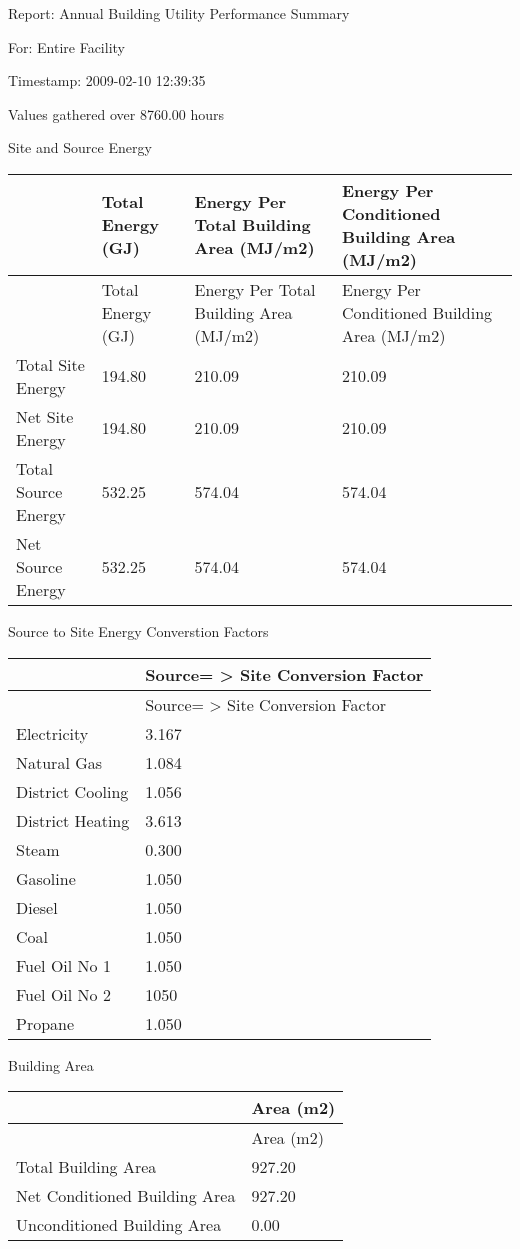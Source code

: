 Report: Annual Building Utility Performance Summary

For: Entire Facility

Timestamp: 2009-02-10 12:39:35

Values gathered over 8760.00 hours

Site and Source Energy

\begin{longtable}[c]{>{\raggedright}p{1.5in}>{\raggedright}p{1.5in}>{\raggedright}p{1.5in}>{\raggedright}p{1.5in}}
\toprule 
~ & Total Energy (GJ) & Energy Per Total Building Area (MJ/m2) & Energy Per Conditioned Building Area (MJ/m2) \tabularnewline
\midrule
\endfirsthead

\toprule 
~ & Total Energy (GJ) & Energy Per Total Building Area (MJ/m2) & Energy Per Conditioned Building Area (MJ/m2) \tabularnewline
\midrule
\endhead

Total Site Energy & 194.80 & 210.09 & 210.09 \tabularnewline
Net Site Energy & 194.80 & 210.09 & 210.09 \tabularnewline
Total Source Energy & 532.25 & 574.04 & 574.04 \tabularnewline
Net Source Energy & 532.25 & 574.04 & 574.04 \tabularnewline
\bottomrule
\end{longtable}

Source to Site Energy Converstion Factors

\begin{longtable}[c]{@{}ll@{}}
\toprule 
~ & Source= > Site Conversion Factor \tabularnewline
\midrule
\endfirsthead

\toprule 
~ & Source= > Site Conversion Factor \tabularnewline
\midrule
\endhead

Electricity & 3.167 \tabularnewline
Natural Gas & 1.084 \tabularnewline
District Cooling & 1.056 \tabularnewline
District Heating & 3.613 \tabularnewline
Steam & 0.300 \tabularnewline
Gasoline & 1.050 \tabularnewline
Diesel & 1.050 \tabularnewline
Coal & 1.050 \tabularnewline
Fuel Oil No 1 & 1.050 \tabularnewline
Fuel Oil No 2 & 1050 \tabularnewline
Propane & 1.050 \tabularnewline
\bottomrule
\end{longtable}

Building Area

\begin{longtable}[c]{@{}ll@{}}
\toprule 
~ & Area (m2) \tabularnewline
\midrule
\endfirsthead

\toprule 
~ & Area (m2) \tabularnewline
\midrule
\endhead

Total Building Area & 927.20 \tabularnewline
Net Conditioned Building Area & 927.20 \tabularnewline
Unconditioned Building Area & 0.00 \tabularnewline
\bottomrule
\end{longtable}

